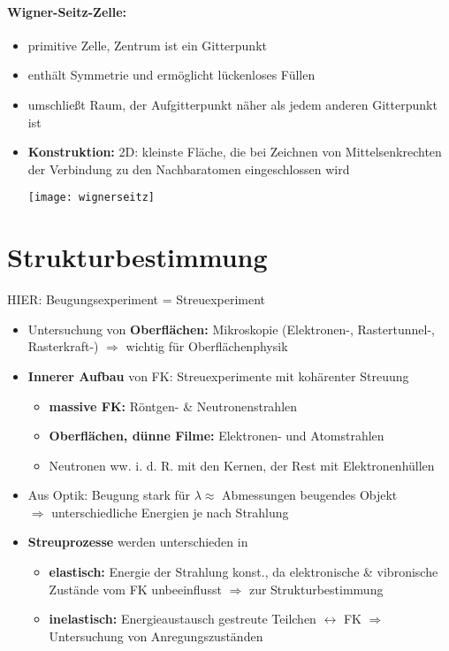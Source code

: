 \documentclass[a4paper,12pt]{article}
\begin{document}
\paragraph*{Wigner-Seitz-Zelle:}
\begin{itemize}
	\item primitive Zelle, Zentrum ist ein Gitterpunkt
	\item enthält Symmetrie und ermöglicht lückenloses Füllen
	\item umschließt Raum, der Aufgitterpunkt näher als jedem anderen Gitterpunkt ist
	\item \textbf{Konstruktion:} 2D: kleinste Fläche, die bei Zeichnen von Mittelsenkrechten der Verbindung zu den Nachbaratomen eingeschlossen wird
	\begin{center}
		\texttt{[image: wignerseitz]}
	\end{center}
\end{itemize}
\section{Strukturbestimmung}
HIER: Beugungsexperiment = Streuexperiment
\begin{itemize}
	\item Untersuchung von \textbf{Oberflächen:} Mikroskopie (Elektronen-, Rastertunnel-, Rasterkraft-) $ \Rightarrow $ wichtig für Oberflächenphysik
	\item \textbf{Innerer Aufbau} von FK: Streuexperimente mit kohärenter Streuung \begin{itemize}
		\item \textbf{massive FK:} Röntgen- \& Neutronenstrahlen
		\item \textbf{Oberflächen, dünne Filme:} Elektronen- und Atomstrahlen
		\item Neutronen ww. i. d. R. mit den Kernen, der Rest mit Elektronenhüllen 
	\end{itemize}
	\item Aus Optik: Beugung stark für $ \lambda\approx $ Abmessungen beugendes Objekt\\
	$ \Rightarrow $ unterschiedliche Energien je nach Strahlung
	\item \textbf{Streuprozesse} werden unterschieden in
	\begin{itemize}
		\item \textbf{elastisch:} Energie der Strahlung konst., da elektronische \& vibronische Zustände vom FK unbeeinflusst $ \Rightarrow $ zur Strukturbestimmung
		\item \textbf{inelastisch:}  Energieaustausch gestreute Teilchen $ \leftrightarrow $ FK $ \Rightarrow $ Untersuchung von Anregungszuständen
	\end{itemize} 
\end{itemize}
\end{document}

